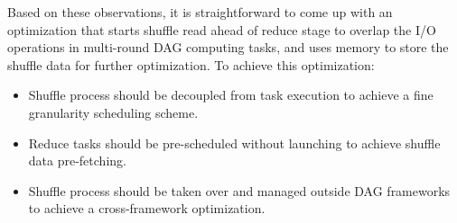 Based on these observations, it is straightforward to come up with an optimization that starts shuffle read ahead of reduce stage to overlap the I/O operations in multi-round DAG computing tasks, and uses memory to store the shuffle data for further optimization. 
To achieve this optimization:
\begin{itemize}
	\item Shuffle process should be decoupled from task execution to achieve a fine granularity scheduling scheme.
	\item Reduce tasks should be pre-scheduled without launching to achieve shuffle data pre-fetching.
	\item Shuffle process should be taken over and managed outside DAG frameworks to achieve a cross-framework optimization.
\end{itemize}
